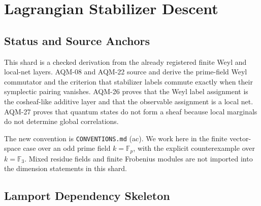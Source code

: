 
\section{Lagrangian Stabilizer Descent}
\label{sec:lagrangian-stabilizer-descent}

\subsection{Status and Source Anchors}

This shard is a checked derivation from the already registered finite Weyl
and local-net layers.  AQM-08 and AQM-22 source and derive the prime-field
Weyl commutator and the criterion that stabilizer labels commute exactly when
their symplectic pairing vanishes.  AQM-26 proves that the Weyl label
assignment is the cosheaf-like additive layer and that the observable
assignment is a local net.  AQM-27 proves that quantum states do not form a
sheaf because local marginals do not determine global correlations.

The new convention is \texttt{CONVENTIONS.md} (ac).  We work here in the
finite vector-space case over an odd prime field \(k=\mathbb F_p\), with the
explicit counterexample over \(k=\mathbb F_3\).  Mixed residue fields and
finite Frobenius modules are not imported into the dimension statements in
this shard.

\subsection{Lamport Dependency Skeleton}

